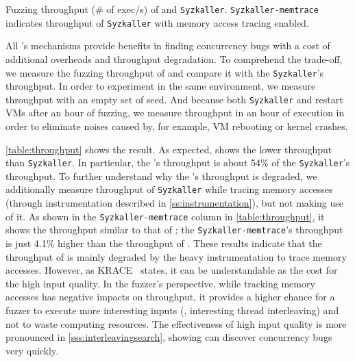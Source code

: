 %
\begin{table}[t]
  \small
  \centering
  
  \caption{Fuzzing throughput (\# of exec/s) of \sys and
    \texttt{Syzkaller}. \texttt{Syzkaller-memtrace} indicates
    throughput of \texttt{Syzkaller} with memory access tracing
    enabled.}
  \label{table:throughput}
  \vspace{-5pt}
\end{table}
%
All \sys's mechanisms provide benefits in finding concurrency bugs
with a cost of additional overheads and throughput degradation.
%
To comprehend the trade-off, we measure the fuzzing throughput of \sys
and compare it with the \texttt{Syzkaller}'s throughput.
%
In order to experiment in the same environment, we measure throughput
with an empty set of seed. And because both \texttt{Syzkaller} and
\sys restart VMs after an hour of fuzzing, we measure throughput in an
hour of execution in order to eliminate noises caused by, for example,
VM rebooting or kernel crashes.



\autoref{table:throughput} shows the result. As expected, \sys shows
the lower throughput than \texttt{Syzkaller}. In particular, the
\sys's throughput is about 54\% of the \texttt{Syzkaller}'s
throughput.
%
To further understand why the \sys's throughput is degraded, we
additionally measure throughput of \texttt{Syzkaller} while tracing
memory accesses (through instrumentation described in
\autoref{ss:instrumentation}), but not making use of it.
%
As shown in the \texttt{Syzkaller-memtrace} column in
\autoref{table:throughput}, it shows the throughput similar to that of
\sys; the \texttt{Syzkaller-memtrace}'s throughput is just 4.1\%
higher than the throughput of \sys.
%
These results indicate that the throughput of \sys is mainly degraded
by the heavy instrumentation to trace memory accesses.
%
However, as KRACE~\cite{krace} states, it can be understandable as the
cost for the high input quality.
%
In the fuzzer's perspective, while tracking memory accesses has
negative impacts on throughput, it provides a higher chance for a
fuzzer to execute more interesting inputs (\ie, interesting thread
interleaving) and not to waste computing resources.
%
The effectiveness of high input quality is more pronounced in
\autoref{sss:interleavingsearch}, showing \sys can discover
concurrency bugs very quickly.




